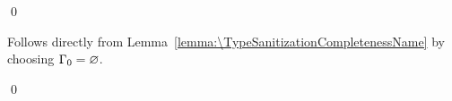 \qed

\begin{corollary}[\TypeSanitizationCompletenessPrettyName]
  \label{lemma:\TypeSanitizationCompletenessPrettyName}
  \TypeSanitizationCompletenessPrettyBody
\end{corollary}

\proof

Follows directly from Lemma~\ref{lemma:\TypeSanitizationCompletenessName}
by choosing $\Gamma_0 = \varnothing$.

\qed

\begin{lemma}[\TypeSanitizationCompletenessUnificationName]\leavevmode
  \label{lemma:\TypeSanitizationCompletenessUnificationName}
  \TypeSanitizationCompletenessUnificationBody
\end{lemma}

\proof


